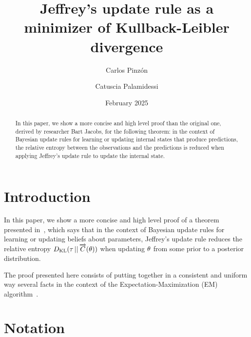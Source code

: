 \documentclass{article}
\title{Jeffrey's update rule as a minimizer of Kullback-Leibler divergence}
\author{Carlos Pinzón \and Catuscia Palamidessi}
\date{February 2025}
\begin{document}
\maketitle
\begin{abstract}
In this paper, we show a more concise and high level proof than the original one, derived by researcher Bart Jacobs, for the following theorem: in the context of Bayesian update rules for learning or updating internal states that produce predictions, the relative entropy between the observations and the predictions is reduced when applying Jeffrey's update rule to update the internal state.
\end{abstract}

\NewDocumentCommand{\oo}{}{{\infty}}
\NewDocumentCommand{\px}{}{{\ensuremath{\theta}}}
\NewDocumentCommand{\py}{}{{\ensuremath{\tau}}}


\section{Introduction}

In this paper, we show a more concise and high level proof of a theorem presented in~\cite{jacobs2021learning}, which says that in the context of Bayesian update rules for learning or updating beliefs about parameters, Jeffrey's update rule reduces the relative entropy $\DKL[\py][\Cfwd(\px)]$ when updating $\px$ from some prior to a posterior distribution.

The proof presented here consists of putting together in a consistent and uniform way several facts in the context of the Expectation-Maximization (EM) algorithm~\cite{elsalamouny2020generalized,dempster1977maximum,mclachlan2007algorithm,wu1983convergence}.

\section{Notation}
\end{document}
